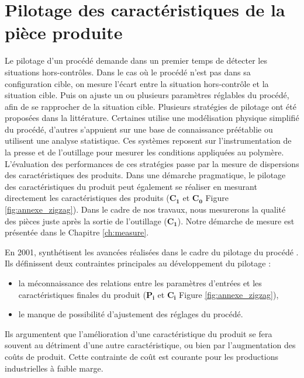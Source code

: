 \section{Pilotage des caractéristiques de la pièce produite}
Le pilotage d’un procédé demande dans un premier temps de détecter les situations hors-contrôles.
Dans le cas où le procédé n'est pas dans sa configuration cible, on mesure l’écart entre la situation hors-contrôle et la situation cible.
Puis on ajuste un ou plusieurs paramètres réglables du procédé, afin de se rapprocher de la situation cible.
Plusieurs stratégies de pilotage ont été proposées dans la littérature.
Certaines utilise une modélisation physique simplifié du procédé, d'autres s'appuient sur une base de connaissance préétablie ou utilisent une analyse statistique.
Ces systèmes reposent sur l’instrumentation de la presse et de l'outillage pour mesurer les conditions appliquées au polymère.
L'évaluation des performances de ces stratégies passe par la mesure de dispersions des caractéristiques des produits.
Dans une démarche pragmatique, le pilotage des caractéristiques du produit peut également se réaliser en mesurant directement les caractéristiques des produits ($\boldsymbol{C_1}$ et $\boldsymbol{C_0}$ Figure \ref{fig:annexe_zigzag}).
Dans le cadre de nos travaux, nous mesurerons la qualité des pièces juste après la sortie de l'outillage ($\boldsymbol{C_1}$).
Notre démarche de mesure est présentée dans le Chapitre \ref{ch:measure}.

En 2001, \citeauthor{nwokah_control_2001} synthétisent les avancées réalisées dans le cadre du pilotage du procédé \cite{nwokah_control_2001}.
Ils définissent deux contraintes principales au développement du pilotage :
\begin{itemize}
	\item la méconnaissance des relations entre les paramètres d’entrées et les caractéristiques finales du produit ($\boldsymbol{P_i}$ et $\boldsymbol{C_i}$ Figure \ref{fig:annexe_zigzag}),
	\item le manque de possibilité d’ajustement des réglages du procédé.
\end{itemize}
Ils argumentent que l’amélioration d’une caractéristique du produit se fera souvent au détriment d’une autre caractéristique, ou bien par l'augmentation des coûts de produit.
Cette contrainte de coût est courante pour les productions industrielles à faible marge.


